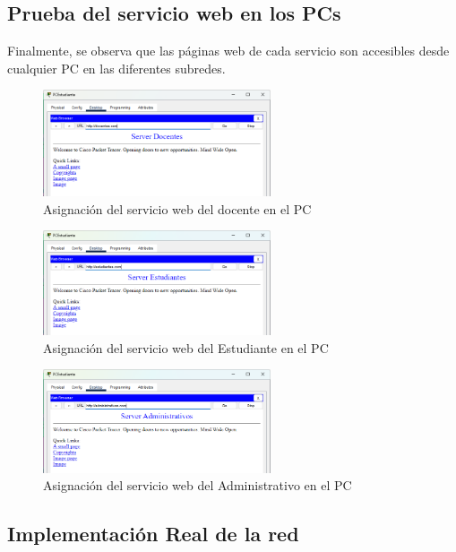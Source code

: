    \subsection*{Prueba del servicio web en los PCs}
    Finalmente, se observa que las páginas web de cada servicio son accesibles desde cualquier PC en las diferentes subredes.
    \begin{figure}[H]
        \centering
        \includegraphics[width=0.6\textwidth]{img/wedDocEs.png}
        \caption{Asignación del servicio web del docente en el PC}
        \label{fig:pcdweb}
    \end{figure}
    \begin{figure}[H]
        \centering
        \includegraphics[width=0.6\textwidth]{img/web estudiantes.png}
        \caption{Asignación del servicio web del Estudiante en el PC}
        \label{fig:pceweb}
    \end{figure}
    \begin{figure}[H]
        \centering
        \includegraphics[width=0.6\textwidth]{img/web adminis.png}
        \caption{Asignación del servicio web del Administrativo en el PC}
        \label{fig:pcAweb}
    \end{figure}

    \subsection{Implementación Real de la red}
